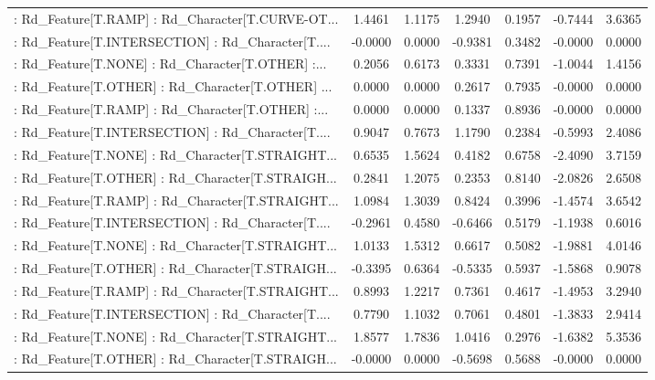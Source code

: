 \begin{longtable}{p{4cm}cccccc}
 : Rd\_Feature[T.RAMP] : Rd\_Character[T.CURVE-OT... &  1.4461 &    1.1175 &  1.2940 &       0.1957 & -0.7444 &  3.6365 \\
 : Rd\_Feature[T.INTERSECTION] : Rd\_Character[T.... & -0.0000 &    0.0000 & -0.9381 &       0.3482 & -0.0000 &  0.0000 \\
 : Rd\_Feature[T.NONE] : Rd\_Character[T.OTHER] :... &  0.2056 &    0.6173 &  0.3331 &       0.7391 & -1.0044 &  1.4156 \\
 : Rd\_Feature[T.OTHER] : Rd\_Character[T.OTHER] ... &  0.0000 &    0.0000 &  0.2617 &       0.7935 & -0.0000 &  0.0000 \\
 : Rd\_Feature[T.RAMP] : Rd\_Character[T.OTHER] :... &  0.0000 &    0.0000 &  0.1337 &       0.8936 & -0.0000 &  0.0000 \\
 : Rd\_Feature[T.INTERSECTION] : Rd\_Character[T.... &  0.9047 &    0.7673 &  1.1790 &       0.2384 & -0.5993 &  2.4086 \\
 : Rd\_Feature[T.NONE] : Rd\_Character[T.STRAIGHT... &  0.6535 &    1.5624 &  0.4182 &       0.6758 & -2.4090 &  3.7159 \\
 : Rd\_Feature[T.OTHER] : Rd\_Character[T.STRAIGH... &  0.2841 &    1.2075 &  0.2353 &       0.8140 & -2.0826 &  2.6508 \\
 : Rd\_Feature[T.RAMP] : Rd\_Character[T.STRAIGHT... &  1.0984 &    1.3039 &  0.8424 &       0.3996 & -1.4574 &  3.6542 \\
 : Rd\_Feature[T.INTERSECTION] : Rd\_Character[T.... & -0.2961 &    0.4580 & -0.6466 &       0.5179 & -1.1938 &  0.6016 \\
 : Rd\_Feature[T.NONE] : Rd\_Character[T.STRAIGHT... &  1.0133 &    1.5312 &  0.6617 &       0.5082 & -1.9881 &  4.0146 \\
 : Rd\_Feature[T.OTHER] : Rd\_Character[T.STRAIGH... & -0.3395 &    0.6364 & -0.5335 &       0.5937 & -1.5868 &  0.9078 \\
 : Rd\_Feature[T.RAMP] : Rd\_Character[T.STRAIGHT... &  0.8993 &    1.2217 &  0.7361 &       0.4617 & -1.4953 &  3.2940 \\
 : Rd\_Feature[T.INTERSECTION] : Rd\_Character[T.... &  0.7790 &    1.1032 &  0.7061 &       0.4801 & -1.3833 &  2.9414 \\
 : Rd\_Feature[T.NONE] : Rd\_Character[T.STRAIGHT... &  1.8577 &    1.7836 &  1.0416 &       0.2976 & -1.6382 &  5.3536 \\
 : Rd\_Feature[T.OTHER] : Rd\_Character[T.STRAIGH... & -0.0000 &    0.0000 & -0.5698 &       0.5688 & -0.0000 &  0.0000 \\

\end{longtable}
